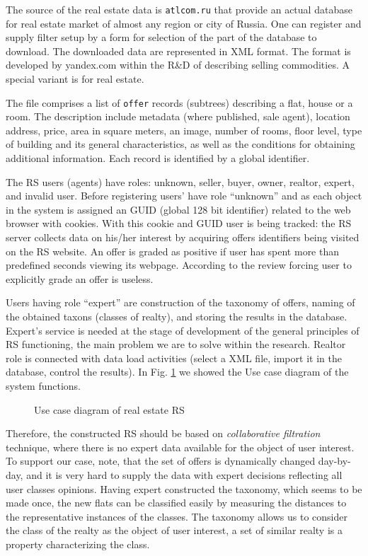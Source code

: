 \documentclass[conference]{IEEEtran}
\begin{document}
The source of the real estate data is \texttt{atlcom.ru} that provide an actual database for real estate market of almost any region or city of Russia.  One can register and supply filter setup by a form for selection of the part of the database to download. The downloaded data are represented in XML format.  The format is developed by yandex.com within the R\&D of describing selling commodities.  A special variant is for real estate.

The file comprises a list of \texttt{offer} records (subtrees) describing a flat, house or a room.  The description include metadata (where published, sale agent), location address, price, area in square meters, an image, number of rooms, floor level, type of building and its general characteristics, as well as the conditions for obtaining additional information.  Each record is identified by a global identifier.

The RS users (agents) have roles: unknown, seller, buyer, owner, realtor, expert, and invalid user.  Before  registering users' have role ``unknown'' and as each object in the system is assigned an GUID (global 128 bit identifier) related to the web browser with cookies.  With this cookie and GUID user is being tracked: the RS server collects data on his/her interest by acquiring offers identifiers being visited on the RS website.  An offer is graded as positive if user has spent more than predefined seconds viewing its webpage.  According to the review \cite{br13} forcing user to explicitly grade an offer is useless.

Users having role ``expert'' are construction of the taxonomy of offers, naming of the obtained taxons (classes of realty), and storing the results in the database.  Expert's service is needed at the stage of development of the general principles of RS functioning, the main problem we are to solve within the research.  Realtor role is connected with data load activities (select a XML file, import it in the database, control the results).  In Fig. \ref{fig:use-case} we showed the Use case diagram of the system functions.

\begin{figure}[tb]
  \centering

  \caption{Use case diagram of real estate RS}
  \label{fig:use-case}
\end{figure}

Therefore, the constructed RS should be based on \emph{collaborative filtration} technique, where there is no expert data available for the object of user interest.  To support our case, note, that the set of offers is dynamically changed day-by-day, and it is very hard to supply the data with expert decisions reflecting all user classes opinions.  Having expert constructed the taxonomy, which seems to be made once, the new flats can be classified easily by measuring the distances to the representative instances of the classes.  The taxonomy allows us to consider the class of the realty as the object of user interest, a set of similar realty is a property characterizing the class.
\end{document}
